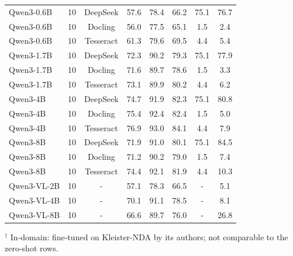 \begin{table}[ht]
\begin{tabular}{llcccccc}
Qwen3-0.6B & 10 & DeepSeek & 57.6 & 78.4 & 66.2 & 75.1 & 76.7 \\
Qwen3-0.6B & 10 & Docling & 56.0 & 77.5 & 65.1 & 1.5 & 2.4 \\
Qwen3-0.6B & 10 & Tesseract & 61.3 & 79.6 & 69.5 & 4.4 & 5.4 \\
Qwen3-1.7B & 10 & DeepSeek & 72.3 & 90.2 & 79.3 & 75.1 & 77.9 \\
Qwen3-1.7B & 10 & Docling & 71.6 & 89.7 & 78.6 & 1.5 & 3.3 \\
Qwen3-1.7B & 10 & Tesseract & 73.1 & 89.9 & 80.2 & 4.4 & 6.2 \\
Qwen3-4B & 10 & DeepSeek & 74.7 & 91.9 & 82.3 & 75.1 & 80.8 \\
Qwen3-4B & 10 & Docling & 75.4 & 92.4 & 82.4 & 1.5 & 5.0 \\
Qwen3-4B & 10 & Tesseract & 76.9 & 93.0 & 84.1 & 4.4 & 7.9 \\
Qwen3-8B & 10 & DeepSeek & 71.9 & 91.0 & 80.1 & 75.1 & 84.5 \\
Qwen3-8B & 10 & Docling & 71.2 & 90.2 & 79.0 & 1.5 & 7.4 \\
Qwen3-8B & 10 & Tesseract & 74.4 & 92.1 & 81.9 & 4.4 & 10.3 \\
Qwen3-VL-2B & 10 & - & 57.1 & 78.3 & 66.5 & - & 5.1 \\
Qwen3-VL-4B & 10 & - & 70.1 & 91.1 & 78.5 & - & 8.1 \\
Qwen3-VL-8B & 10 & - & 66.6 & 89.7 & 76.0 & - & 26.8 \\
\bottomrule
\end{tabular}

\vspace{2pt}
{\footnotesize $^\dagger$ In-domain: fine-tuned on Kleister-NDA by its authors; not comparable to the zero-shot rows.}
\end{table}
